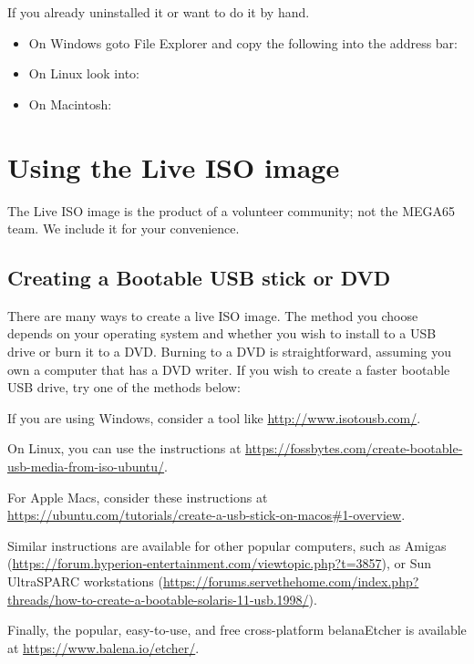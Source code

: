 If you already uninstalled it or want to do it by hand.

\begin{itemize}
    \item On Windows goto File Explorer and copy the following into the address
    bar: 
    \item On Linux look into:
    \item On Macintosh:
\end{itemize}


\section{Using the Live ISO image}
\label{sec:live-iso-image}

The Live ISO image is the product of a volunteer community; not the MEGA65 team. We include it for your convenience.

\subsection{Creating a Bootable USB stick or DVD}

There are many ways to create a live ISO image. The method you choose depends on your operating system and whether you wish to install to a USB drive or burn it to a DVD. Burning to a DVD is straightforward, assuming you own a computer that has a DVD writer. If you wish to create a faster bootable USB drive, try one of the methods below:

If you are using Windows, consider a tool like \url{http://www.isotousb.com/}.

On Linux, you can use the instructions at \url{https://fossbytes.com/create-bootable-usb-media-from-iso-ubuntu/}.

For Apple Macs, consider these instructions at
\url{https://ubuntu.com/tutorials/create-a-usb-stick-on-macos#1-overview}.

Similar instructions are available for other popular computers, such as Amigas (\url{https://forum.hyperion-entertainment.com/viewtopic.php?t=3857}), or Sun UltraSPARC workstations (\url{https://forums.servethehome.com/index.php?threads/how-to-create-a-bootable-solaris-11-usb.1998/}).

Finally, the popular, easy-to-use, and free cross-platform belanaEtcher is available at \url{https://www.balena.io/etcher/}.

